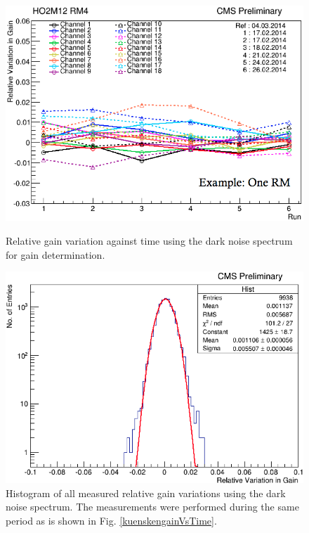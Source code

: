 \begin{figure}[h]
\centering
\begin{minipage}[t]{0.475\textwidth}
\includegraphics[width=\textwidth]{Figures/kuensken/gainOverTime.png}
\caption{Relative gain variation against time using the dark noise spectrum for gain determination.}
\label{kuenskengainVsTime}
\end{minipage}
\hspace{0.5cm}
\begin{minipage}[t]{0.475\textwidth}
\includegraphics[width=\textwidth]{Figures/kuensken/gainTotal.png}
\caption{Histogram of all measured relative gain variations using the dark noise spectrum. The measurements were performed during the same period as is shown in Fig. \ref{kuenskengainVsTime}.}
\label{kuenskengainHist}
\end{minipage}
\end{figure}
